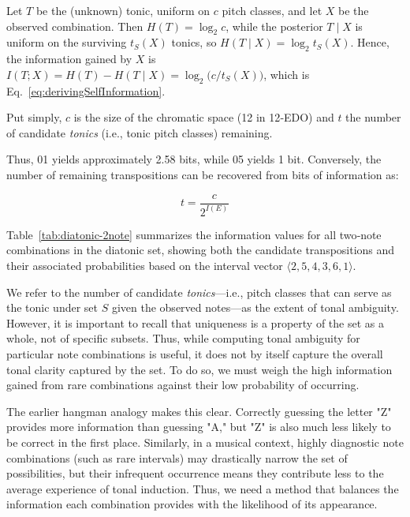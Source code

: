\documentclass[10pt,twocolumn]{article}
\numberwithin{equation}{section} %
\begin{document}
    Let $T$ be the (unknown) tonic, uniform on $c$ pitch classes, and let $X$ be the observed combination.
    Then $H(T)=\log_2 c$, while the posterior $T\!\mid\!X$ is uniform on the surviving $t_S(X)$ tonics, so $H(T\!\mid\!X)=\log_2 t_S(X)$.
    Hence, the information gained by $X$ is $I(T;X)=H(T)-H(T\!\mid\!X)=\log_2\!\bigl(c/t_S(X)\bigr)$, which is Eq.~\ref{eq:derivingSelfInformation}.

    Put simply, $c$ is the size of the chromatic space (12 in 12‑EDO) and $t$ the number of candidate \emph{tonics} (i.e., tonic pitch classes) remaining.

    Thus, 01 yields approximately 2.58 bits, while 05 yields 1 bit.
    Conversely, the number of remaining transpositions can be recovered from bits of information as:

    \begin{equation}
        t = \frac{c}{2^{I(E)}}
        \label{eq:remaining_transpositions}
    \end{equation}

    Table~\ref{tab:diatonic-2note} summarizes the information values for all two‑note combinations in the diatonic set, showing both the candidate transpositions and their associated probabilities based on the interval vector $\langle 2,5,4,3,6,1\rangle$.

    

    We refer to the number of candidate \emph{tonics}—i.e., pitch classes that can serve as the tonic under set $S$ given the observed notes—as the extent of tonal ambiguity.
    However, it is important to recall that uniqueness is a property of the set as a whole, not of specific subsets.
    Thus, while computing tonal ambiguity for particular note combinations is useful, it does not by itself capture the overall tonal clarity captured by the set.
    To do so, we must weigh the high information gained from rare combinations against their low probability of occurring.

    The earlier hangman analogy makes this clear.
    Correctly guessing the letter "Z" provides more information than guessing "A," but "Z" is also much less likely to be correct in the first place.
    Similarly, in a musical context, highly diagnostic note combinations (such as rare intervals) may drastically narrow the set of possibilities, but their infrequent occurrence means they contribute less to the average experience of tonal induction.
    Thus, we need a method that balances the information each combination provides with the likelihood of its appearance.
\end{document}
